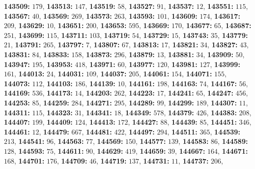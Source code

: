 \textsf{\bfseries 143509:} $179$, \textsf{\bfseries 143513:} $147$, \textsf{\bfseries 143519:} $58$, \textsf{\bfseries 143527:} $91$, \textsf{\bfseries 143537:} $12$, \textsf{\bfseries 143551:} $115$, \textsf{\bfseries 143567:} $40$, \textsf{\bfseries 143569:} $269$, \textsf{\bfseries 143573:} $263$, \textsf{\bfseries 143593:} $101$, \textsf{\bfseries 143609:} $174$, \textsf{\bfseries 143617:} $209$, \textsf{\bfseries 143629:} $10$, \textsf{\bfseries 143651:} $200$, \textsf{\bfseries 143653:} $595$, \textsf{\bfseries 143669:} $170$, \textsf{\bfseries 143677:} $65$, \textsf{\bfseries 143687:} $251$, \textsf{\bfseries 143699:} $115$, \textsf{\bfseries 143711:} $103$, \textsf{\bfseries 143719:} $54$, \textsf{\bfseries 143729:} $15$, \textsf{\bfseries 143743:} $35$, \textsf{\bfseries 143779:} $21$, \textsf{\bfseries 143791:} $265$, \textsf{\bfseries 143797:} $7$, \textsf{\bfseries 143807:} $67$, \textsf{\bfseries 143813:} $17$, \textsf{\bfseries 143821:} $34$, \textsf{\bfseries 143827:} $43$, \textsf{\bfseries 143831:} $84$, \textsf{\bfseries 143833:} $158$, \textsf{\bfseries 143873:} $296$, \textsf{\bfseries 143879:} $13$, \textsf{\bfseries 143881:} $34$, \textsf{\bfseries 143909:} $50$, \textsf{\bfseries 143947:} $195$, \textsf{\bfseries 143953:} $418$, \textsf{\bfseries 143971:} $60$, \textsf{\bfseries 143977:} $120$, \textsf{\bfseries 143981:} $127$, \textsf{\bfseries 143999:} $161$, \textsf{\bfseries 144013:} $24$, \textsf{\bfseries 144031:} $109$, \textsf{\bfseries 144037:} $205$, \textsf{\bfseries 144061:} $154$, \textsf{\bfseries 144071:} $155$, \textsf{\bfseries 144073:} $112$, \textsf{\bfseries 144103:} $186$, \textsf{\bfseries 144139:} $10$, \textsf{\bfseries 144161:} $198$, \textsf{\bfseries 144163:} $74$, \textsf{\bfseries 144167:} $56$, \textsf{\bfseries 144169:} $536$, \textsf{\bfseries 144173:} $14$, \textsf{\bfseries 144203:} $262$, \textsf{\bfseries 144223:} $17$, \textsf{\bfseries 144241:} $65$, \textsf{\bfseries 144247:} $456$, \textsf{\bfseries 144253:} $85$, \textsf{\bfseries 144259:} $284$, \textsf{\bfseries 144271:} $295$, \textsf{\bfseries 144289:} $99$, \textsf{\bfseries 144299:} $189$, \textsf{\bfseries 144307:} $11$, \textsf{\bfseries 144311:} $115$, \textsf{\bfseries 144323:} $31$, \textsf{\bfseries 144341:} $18$, \textsf{\bfseries 144349:} $578$, \textsf{\bfseries 144379:} $426$, \textsf{\bfseries 144383:} $208$, \textsf{\bfseries 144407:} $199$, \textsf{\bfseries 144409:} $124$, \textsf{\bfseries 144413:} $172$, \textsf{\bfseries 144427:} $88$, \textsf{\bfseries 144439:} $85$, \textsf{\bfseries 144451:} $346$, \textsf{\bfseries 144461:} $12$, \textsf{\bfseries 144479:} $667$, \textsf{\bfseries 144481:} $422$, \textsf{\bfseries 144497:} $294$, \textsf{\bfseries 144511:} $365$, \textsf{\bfseries 144539:} $213$, \textsf{\bfseries 144541:} $96$, \textsf{\bfseries 144563:} $77$, \textsf{\bfseries 144569:} $150$, \textsf{\bfseries 144577:} $139$, \textsf{\bfseries 144583:} $86$, \textsf{\bfseries 144589:} $128$, \textsf{\bfseries 144593:} $75$, \textsf{\bfseries 144611:} $90$, \textsf{\bfseries 144629:} $419$, \textsf{\bfseries 144659:} $39$, \textsf{\bfseries 144667:} $164$, \textsf{\bfseries 144671:} $168$, \textsf{\bfseries 144701:} $176$, \textsf{\bfseries 144709:} $46$, \textsf{\bfseries 144719:} $137$, \textsf{\bfseries 144731:} $11$, \textsf{\bfseries 144737:} $206$, 
